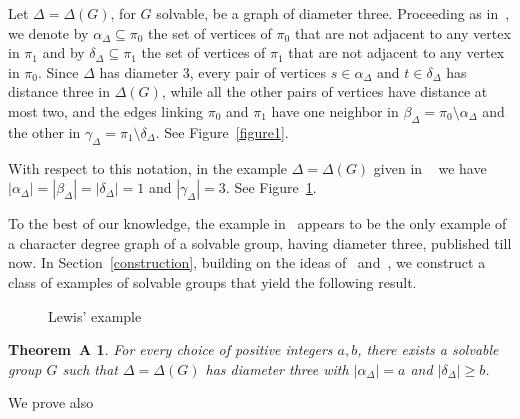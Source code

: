 \documentclass{amsart}
\newtheorem*{thmA}{Theorem~A}
\begin{document}
Let $\Delta = \Delta(G)$,  for $G$ solvable, be a graph of diameter three. Proceeding as in~\cite{sass},
we denote by $\alpha_{\Delta} \subseteq \pi_0$ the set of vertices of $\pi_0$ that are not adjacent to any vertex in $\pi_1$ and
by $\delta_{\Delta} \subseteq \pi_1$ the set of vertices of $\pi_1$ that are not adjacent to any vertex in $\pi_0$.
Since $\Delta$ has diameter $3$, every pair of vertices $s \in \alpha_{\Delta}$ and $t \in \delta_{\Delta}$ has distance three in $\Delta(G)$, while all the other
pairs of vertices have distance at most two, and the edges linking $\pi_0$ and $\pi_1$ have one neighbor in
$\beta_{\Delta} = \pi_0 \setminus \alpha_{\Delta}$ and the other in $\gamma_{\Delta} = \pi_1 \setminus \delta_{\Delta}$. See Figure~\ref{figure1}.


With respect to this notation, in the example $\Delta = \Delta(G)$ given in ~\cite{lewis1} we have $|\alpha_{\Delta}| = |\beta_{\Delta}| =|\delta_\Delta|= 1$ and
$|\gamma_{\Delta}| = 3$. See Figure~\ref{figure2}.

To the best of our knowledge, the example in~\cite{lewis1}  appears to be the only example of a character degree graph  of a solvable group, having diameter three,  published till now.
In Section~\ref{construction}, building on the ideas of~\cite{isaacs1} and~\cite{lewis1},  we  construct a class of examples of solvable groups that yield the following result.

\begin{figure}[!ht]
\caption{Lewis' example}\label{figure2}
\end{figure}



\begin{thmA}
  For every choice of positive integers $a, b$, there exists a solvable group $G$ such that $\Delta = \Delta(G)$ has diameter three 
  with $|\alpha_{\Delta}| =  a$ and  $|\delta_{\Delta}| \geq b$.
\end{thmA}

We prove also
\end{document}
